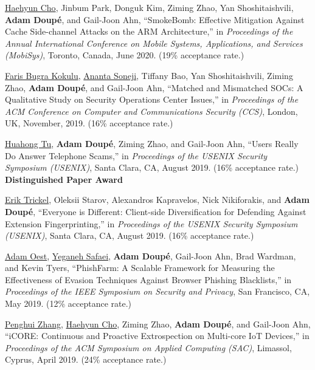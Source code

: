 \documentclass[11pt,letterpaper,sans]{moderncv}
\begin{document}
\begin{etaremune}
\item \underline{Haehyun Cho}, Jinbum Park, Donguk Kim, Ziming Zhao, Yan Shoshitaishvili, \textbf{Adam Doup\'e}, and Gail-Joon Ahn, ``SmokeBomb: Effective Mitigation Against Cache Side-channel Attacks on the ARM Architecture,'' in \emph{Proceedings of the Annual International Conference on Mobile Systems, Applications, and Services (MobiSys)}, Toronto, Canada, June 2020. (19\% acceptance rate.)

\item \underline{Faris Bugra Kokulu}, \underline{Ananta Soneji}, Tiffany Bao, Yan Shoshitaishvili, Ziming Zhao, \textbf{Adam Doup\'e}, and Gail-Joon Ahn, ``Matched and Mismatched SOCs: A Qualitative Study on Security Operations Center Issues,'' in \emph{Proceedings of the ACM Conference on Computer and Communications Security (CCS)}, London, UK, November, 2019. (16\% acceptance rate.)

\item \underline{Huahong Tu}, \textbf{Adam Doup\'e}, Ziming Zhao, and Gail-Joon Ahn, ``Users Really Do Answer Telephone Scams,'' in \emph{Proceedings of the USENIX Security Symposium (USENIX)}, Santa Clara, CA, August 2019. (16\% acceptance rate.) \\
  \textbf{Distinguished Paper Award}

\item \underline{Erik Trickel}, Oleksii Starov, Alexandros Kapravelos, Nick Nikiforakis, and \textbf{Adam Doup\'e}, ``Everyone is Different: Client-side Diversification for Defending Against Extension Fingerprinting,'' in \emph{Proceedings of the USENIX Security Symposium (USENIX)}, Santa Clara, CA, August 2019. (16\% acceptance rate.)

\item \underline{Adam Oest}, \underline{Yeganeh Safaei}, \textbf{Adam Doup\'e}, Gail-Joon Ahn, Brad Wardman, and Kevin Tyers, ``PhishFarm: A Scalable Framework for Measuring the Effectiveness of Evasion Techniques Against Browser Phishing Blacklists,'' in \emph{Proceedings of the IEEE Symposium on Security and Privacy}, San Francisco, CA, May 2019. (12\% acceptance rate.)

 \item \underline{Penghui Zhang}, \underline{Haehyun Cho}, Ziming Zhao, \textbf{Adam Doup\'e}, and Gail-Joon Ahn, ``iCORE: Continuous and Proactive Extrospection on Multi-core IoT Devices,'' in \emph{Proceedings of the ACM Symposium on Applied Computing (SAC)}, Limassol, Cyprus, April 2019. (24\% acceptance rate.)
  

\end{etaremune}
\end{document}
